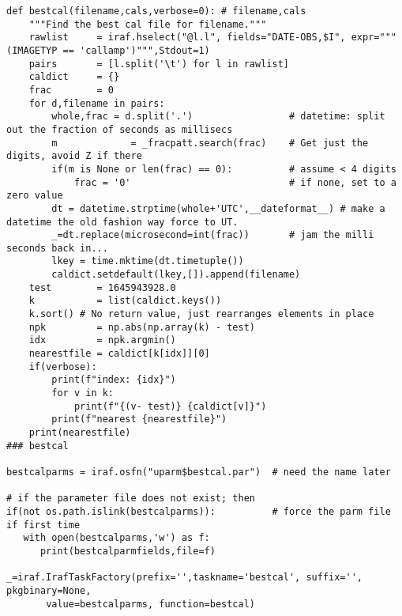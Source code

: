 {\begin{verbatim}
def bestcal(filename,cals,verbose=0): # filename,cals
    """Find the best cal file for filename."""
    rawlist     = iraf.hselect("@l.l", fields="DATE-OBS,$I", expr="""(IMAGETYP == 'callamp')""",Stdout=1)
    pairs       = [l.split('\t') for l in rawlist]
    caldict     = {}
    frac        = 0
    for d,filename in pairs:
        whole,frac = d.split('.')                 # datetime: split out the fraction of seconds as millisecs
        m             = _fracpatt.search(frac)    # Get just the digits, avoid Z if there
        if(m is None or len(frac) == 0):          # assume < 4 digits
            frac = '0'                            # if none, set to a zero value
        dt = datetime.strptime(whole+'UTC',__dateformat__) # make a datetime the old fashion way force to UT.
        _=dt.replace(microsecond=int(frac))       # jam the milli seconds back in...
        lkey = time.mktime(dt.timetuple())
        caldict.setdefault(lkey,[]).append(filename)
    test        = 1645943928.0
    k           = list(caldict.keys())
    k.sort() # No return value, just rearranges elements in place
    npk         = np.abs(np.array(k) - test)
    idx         = npk.argmin()
    nearestfile = caldict[k[idx]][0]
    if(verbose):
        print(f"index: {idx}")
        for v in k:
            print(f"{(v- test)} {caldict[v]}")
        print(f"nearest {nearestfile}")
    print(nearestfile)
### bestcal

bestcalparms = iraf.osfn("uparm$bestcal.par")  # need the name later

# if the parameter file does not exist; then
if(not os.path.islink(bestcalparms)):          # force the parm file if first time
   with open(bestcalparms,'w') as f:
      print(bestcalparmfields,file=f)

_=iraf.IrafTaskFactory(prefix='',taskname='bestcal', suffix='', pkgbinary=None,
       value=bestcalparms, function=bestcal)


\end{verbatim}}
